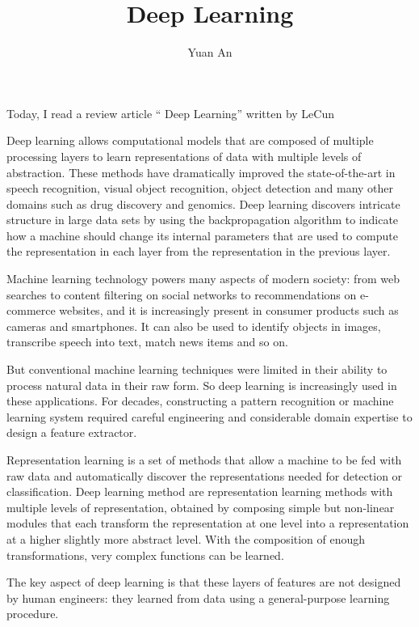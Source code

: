 \documentclass[10pt,twocolumn,letterpaper]{article}
\begin{document}
	\title{Deep Learning}	
	\author{Yuan An}
	\maketitle
	Today, I read a review article `` Deep Learning'' written by LeCun~\etal~\cite{DeepLearning}
	\par
	Deep learning allows computational models that are composed of multiple processing layers to learn representations of data with multiple levels of abstraction. These methods have dramatically improved the state-of-the-art in speech recognition, visual object recognition, object detection and many other domains such as drug discovery and genomics. Deep learning discovers intricate structure in large data sets by using the backpropagation algorithm to indicate how a machine should change its internal parameters that are used to compute the representation in each layer from the representation in the previous layer.
	\par
	Machine learning technology powers many aspects of modern society: from web searches to content filtering on social networks to recommendations on e-commerce websites, and it is increasingly present in consumer products such as cameras and smartphones. It can also be used to identify objects in images, transcribe speech into text, match news items and so on. 
	\par
	But conventional machine learning techniques were limited in their ability to process natural data in their raw form. So deep learning is increasingly used in these applications. For decades, constructing a pattern recognition or machine learning system required careful engineering and considerable domain expertise to design a feature extractor.
	\par
	Representation learning is a set of methods that allow a machine to be fed with raw data and automatically discover the representations needed for detection or classification. Deep learning method are representation learning methods with multiple levels of representation, obtained by composing simple but non-linear modules that each transform the representation at one level into a representation at a higher slightly more abstract level. With the composition of enough transformations, very complex functions can be learned.
	\par
	The key aspect of deep learning is that these layers of features are not designed by human engineers: they learned from data using a general-purpose learning procedure.
	\par
\end{document}
